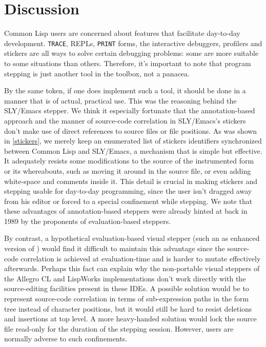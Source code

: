 \documentclass[format=sigconf]{acmart}
\begin{document}
\section{Discussion}

Common Lisp users are concerned about features that facilitate
day-to-day development.  \texttt{TRACE}, REPLs, \texttt{PRINT} forms,
the interactive debuggers, profilers and stickers are all ways to
solve certain debugging problems: some are more suitable to some
situations than others.  Therefore, it's important to note that
program stepping is just another tool in the toolbox, not a panacea.

By the same token, if one does implement such a tool, it should be
done in a manner that is of actual, practical use.  This was the
reasoning behind the SLY/Emacs stepper.  We think it especially
fortunate that the annotation-based approach and the manner of
source-code correlation in SLY/Emacs's stickers don't make use of
direct references to source files or file positions.  As was shown in
\ref{stickers}, we merely keep an enumerated list of stickers
identifiers synchronized between Common Lisp and SLY/Emacs, a
mechanism that is simple but effective.  It adequately resists some
modifications to the source of the instrumented form or its
whereabouts, such as moving it around in the source file, or even
adding white-space and comments inside it.  This detail is crucial in
making stickers and stepping usable for day-to-day programming, since
the user isn't dragged away from his editor or forced to a special
confinement while stepping.  We note that these advantages of
annotation-based steppers were already hinted at back in 1989 by the
proponents of evaluation-based steppers\cite[l.41,
l.42]{evaluation-based}.

By contrast, a hypothetical evaluation-based visual stepper (such an
as enhanced version of \cite{bourguignon}) would find it difficult to
maintain this advantage since the source-code correlation is achieved
at evaluation-time and is harder to mutate effectively afterwards.
Perhaps this fact can explain why the non-portable visual steppers of
the Allegro CL and LispWorks implementations don't work directly with
the source-editing facilities present in these IDEs.  A possible
solution would be to represent source-code correlation in terms of
sub-expression paths in the form tree instead of character positions,
but it would still be hard to resist deletions and insertions at top
level.  A more heavy-handed solution would lock the source file
read-only for the duration of the stepping session.  However, users
are normally adverse to such confinements.
\end{document}
